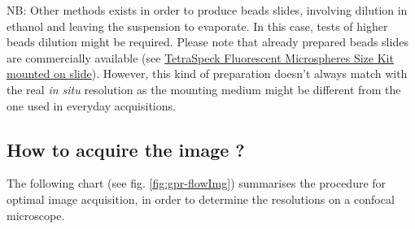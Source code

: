 \documentclass[a4paper, 11pt]{report}%
\begin{document}
NB: Other methods exists in order to produce beads slides, involving dilution in ethanol and leaving the suspension to evaporate. In this case, tests of higher beads dilution might be required. Please note that already prepared beads slides are commercially available (see \href{http://probes.invitrogen.com/media/pis/mp07279.pdf}{TetraSpeck Fluorescent Microspheres Size Kit mounted on slide}). However, this kind of preparation doesn't always match with the real \textit{in situ} resolution as the mounting medium might be different from the one used in everyday acquisitions.

\subsection{How to acquire the image ?}
\label{sec:gpr-flow}

The following chart (see fig. \ref{fig:gpr-flowImg}) summarises the procedure for optimal image acquisition, in order to determine the resolutions on a confocal microscope.
\end{document}
